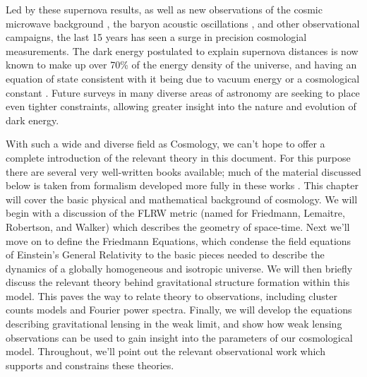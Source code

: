 Led by these supernova results, as well as new observations of the cosmic
microwave background \citep[CMB;][]{WMAP1}, the baryon acoustic oscillations
\citep[BAO;][]{Eisenstein05}, and other observational
campaigns, the last 15 years has seen a surge in precision cosmologial
measurements.
The dark energy postulated to explain supernova distances is now known
to make up over 70\% of the energy density of the universe, and having
an equation of state consistent with it being due to
vacuum energy or a cosmological constant \citep{Kessler2009, WMAP7}.
Future surveys in many diverse areas of astronomy are seeking to place even
tighter constraints, allowing greater insight into the nature and evolution
of dark energy.

With such a wide and diverse field as Cosmology, we can't hope to offer
a complete introduction of the relevant theory in this document.
For this purpose there
are several very well-written books available; much of the material
discussed below is taken from formalism developed more fully in these works
\citep[see, e.g.][]{peebles1993principles, peacock1999cosmological,
  ryden2003cosmology, longair2008galaxy}.
This chapter will cover the basic physical and mathematical background of
cosmology.  We will begin with a discussion of the
FLRW metric (named for Friedmann, Lemaitre,
Robertson, and Walker) which describes the geometry of space-time.
Next we'll move on to define the Friedmann Equations, which condense
the field equations of Einstein's General Relativity to the basic pieces
needed to describe the dynamics of a globally homogeneous and isotropic
universe.  We will then briefly discuss the relevant theory behind
gravitational structure formation within this model.
This paves the way to relate theory to observations, including cluster counts
models and Fourier power spectra.
Finally, we will develop the equations describing gravitational lensing
in the weak limit, and show how weak lensing observations can be used
to gain insight into the parameters of our cosmological model.
Throughout, we'll point out the relevant observational work which supports
and constrains these theories.

